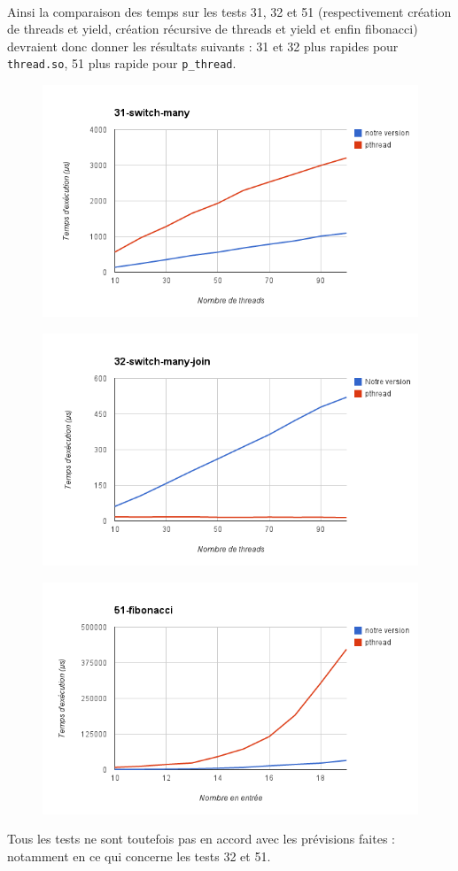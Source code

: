 \paragraph{}
Ainsi la comparaison des temps sur les tests 31, 32 et 51 (respectivement création de threads et yield, création récursive de threads et yield et enfin fibonacci) devraient donc donner les résultats suivants : 31 et 32 plus rapides pour \texttt{thread.so}, 51 plus rapide pour \texttt{p\_thread}.
\\
\begin{figure}[!h]
  \includegraphics[scale=0.5]{31.png}
\end{figure}

\begin{figure}[!h]
  \includegraphics[scale=0.5]{32.png}
\end{figure}

\begin{figure}[!h]
  \includegraphics[scale=0.5]{51.png}
\end{figure}

Tous les tests ne sont toutefois pas en accord avec les prévisions faites : notamment en ce qui concerne les tests 32 et 51.

